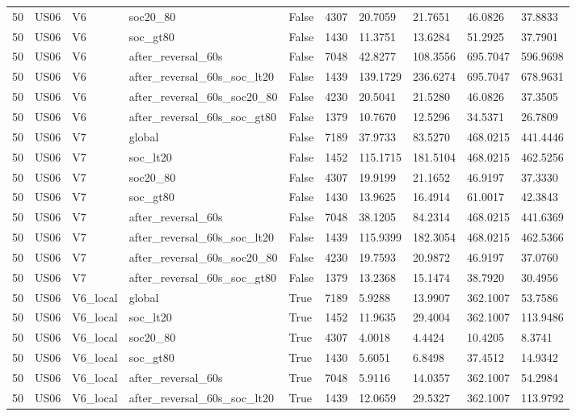 \begin{tabular}{llllllllll}
50 & US06 & V6 & soc20\_80 & False & 4307 & 20.7059 & 21.7651 & 46.0826 & 37.8833 \\
50 & US06 & V6 & soc\_gt80 & False & 1430 & 11.3751 & 13.6284 & 51.2925 & 37.7901 \\
50 & US06 & V6 & after\_reversal\_60s & False & 7048 & 42.8277 & 108.3556 & 695.7047 & 596.9698 \\
50 & US06 & V6 & after\_reversal\_60s\_soc\_lt20 & False & 1439 & 139.1729 & 236.6274 & 695.7047 & 678.9631 \\
50 & US06 & V6 & after\_reversal\_60s\_soc20\_80 & False & 4230 & 20.5041 & 21.5280 & 46.0826 & 37.3505 \\
50 & US06 & V6 & after\_reversal\_60s\_soc\_gt80 & False & 1379 & 10.7670 & 12.5296 & 34.5371 & 26.7809 \\
50 & US06 & V7 & global & False & 7189 & 37.9733 & 83.5270 & 468.0215 & 441.4446 \\
50 & US06 & V7 & soc\_lt20 & False & 1452 & 115.1715 & 181.5104 & 468.0215 & 462.5256 \\
50 & US06 & V7 & soc20\_80 & False & 4307 & 19.9199 & 21.1652 & 46.9197 & 37.3330 \\
50 & US06 & V7 & soc\_gt80 & False & 1430 & 13.9625 & 16.4914 & 61.0017 & 42.3843 \\
50 & US06 & V7 & after\_reversal\_60s & False & 7048 & 38.1205 & 84.2314 & 468.0215 & 441.6369 \\
50 & US06 & V7 & after\_reversal\_60s\_soc\_lt20 & False & 1439 & 115.9399 & 182.3054 & 468.0215 & 462.5366 \\
50 & US06 & V7 & after\_reversal\_60s\_soc20\_80 & False & 4230 & 19.7593 & 20.9872 & 46.9197 & 37.0760 \\
50 & US06 & V7 & after\_reversal\_60s\_soc\_gt80 & False & 1379 & 13.2368 & 15.1474 & 38.7920 & 30.4956 \\
50 & US06 & V6\_local & global & True & 7189 & 5.9288 & 13.9907 & 362.1007 & 53.7586 \\
50 & US06 & V6\_local & soc\_lt20 & True & 1452 & 11.9635 & 29.4004 & 362.1007 & 113.9486 \\
50 & US06 & V6\_local & soc20\_80 & True & 4307 & 4.0018 & 4.4424 & 10.4205 & 8.3741 \\
50 & US06 & V6\_local & soc\_gt80 & True & 1430 & 5.6051 & 6.8498 & 37.4512 & 14.9342 \\
50 & US06 & V6\_local & after\_reversal\_60s & True & 7048 & 5.9116 & 14.0357 & 362.1007 & 54.2984 \\
50 & US06 & V6\_local & after\_reversal\_60s\_soc\_lt20 & True & 1439 & 12.0659 & 29.5327 & 362.1007 & 113.9792 \\

\end{tabular}
